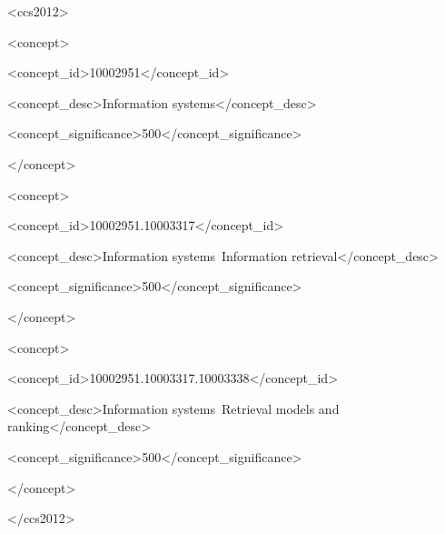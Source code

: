 \begin{CCSXML}

<ccs2012>

   <concept>

       <concept_id>10002951</concept_id>

       <concept_desc>Information systems</concept_desc>

       <concept_significance>500</concept_significance>

       </concept>

   <concept>

       <concept_id>10002951.10003317</concept_id>

       <concept_desc>Information systems~Information retrieval</concept_desc>

       <concept_significance>500</concept_significance>

       </concept>

   <concept>

       <concept_id>10002951.10003317.10003338</concept_id>

       <concept_desc>Information systems~Retrieval models and ranking</concept_desc>

       <concept_significance>500</concept_significance>

       </concept>

</ccs2012>

\end{CCSXML}

 




